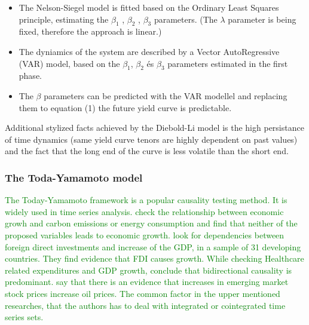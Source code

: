 \documentclass[12pt,bibliography=totoc]{article}
\begin{document}
\begin{itemize}
\item The Nelson-Siegel model is fitted based on the Ordinary Least Squares principle, estimating the $\beta_{1}$ ,  $\beta_{2}$ ,  $\beta_{3}$  parameters. (The $\lambda$ parameter is being fixed, therefore the approach is linear.)
\item The dyniamics of the system are described by a Vector AutoRegressive (VAR) model, based on the $\beta_{1}$,  $\beta_{2}$ és $\beta_{3}$ parameters estimated in the first phase.
\item The $\beta$ parameters can be predicted with the VAR modellel and replacing them to  equation (1) the future yield curve is predictable.

\end{itemize}

Additional stylized facts achieved by the Diebold-Li model is the high persistance of time dynamics (same yield curve tenors are highly dependent on past values) and the fact that the long end of the curve is less volatile than the short end.


\subsubsection{The Toda-Yamamoto model}

\textcolor{green}{The Today-Yamamoto framework is a popular causality testing method. It is widely used in time series analysis. \cite{zhang2009energy} check the relationship between economic growh and carbon emissions or energy consumption and find that neither of the proposed variables leads to economic growth. \cite{hansen2006causal} look for dependencies between foreign direct investments and increase of the GDP, in a sample of 31 developing countries. They find evidence that FDI causes growth.  While checking Healthcare related expenditures and GDP growth, \cite{amiri2012granger} conclude that bidirectional causality is predominant. \cite{basher2012oil} say that there is an evidence that increases in emerging market stock prices increase oil prices. The common factor in the upper mentioned researches, that the authors has to deal with integrated or cointegrated time series sets.}
\end{document}
